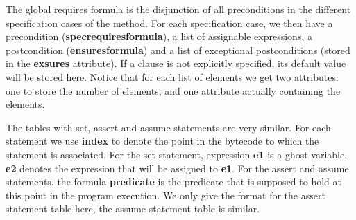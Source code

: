 \noindent{}

The global requires formula is the disjunction of all preconditions in
the different specification cases of the method. For each
specification case, we then have a precondition
(\textbf{spec\unsc requires\unsc formula}), a list of assignable expressions,
a postcondition (\textbf{ensures\unsc formula}) and a list of exceptional
postconditions (stored in the \textbf{exsures} attribute). If a clause
is not explicitly specified, its default value will be stored
here. Notice that for each list of elements we get two attributes: one
to store the number of elements, and one attribute actually containing
the elements.

The tables with set, assert and assume statements are very
similar. For each statement we use \textbf{index} to denote the point
in the bytecode to which the statement is associated. For the set
statement, expression \textbf{e1} is a ghost variable, \textbf{e2}
denotes the expression that will be assigned to \textbf{e1}. For the
assert and assume statements, the formula \textbf{predicate} is the
predicate that is supposed to hold at this point in the program
execution. We only give the format for the assert statement table
here, the assume statement table is similar.\\

